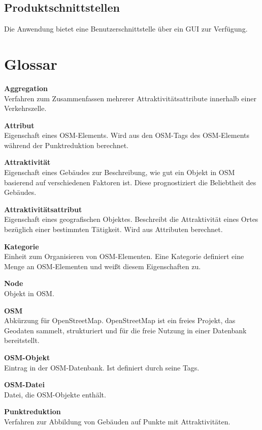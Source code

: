 \documentclass[parskip=full]{scrartcl} %
\begin{document}
\subsection{Produktschnittstellen}
Die Anwendung bietet eine Benutzerschnittstelle über ein GUI zur Verfügung.
\newpage





\section{Glossar}

\textbf{Aggregation}\\
Verfahren zum Zusammenfassen mehrerer Attraktivitätsattribute innerhalb einer Verkehrszelle.

\textbf{Attribut}\\
Eigenschaft eines OSM-Elements. Wird aus den OSM-Tags des OSM-Elements während der Punktreduktion berechnet.

\textbf{Attraktivität}\\
Eigenschaft eines Gebäudes zur Beschreibung, wie gut ein Objekt in OSM basierend auf verschiedenen Faktoren ist. Diese prognostiziert die Beliebtheit des Gebäudes.

\textbf{Attraktivitätsattribut}\\
Eigenschaft eines geografischen Objektes. Beschreibt die Attraktivität eines Ortes bezüglich einer bestimmten Tätigkeit. Wird aus Attributen berechnet.

\textbf{Kategorie}\\
Einheit zum Organisieren von OSM-Elementen. Eine Kategorie definiert eine Menge an OSM-Elementen und weißt diesem Eigenschaften zu.

\textbf{Node}\\
Objekt in OSM.

\textbf{OSM}\\
Abkürzung für OpenStreetMap. OpenStreetMap ist ein freies Projekt, das Geodaten sammelt, strukturiert und für die freie Nutzung in einer Datenbank bereitstellt.

\textbf{OSM-Objekt}\\
Eintrag in der OSM-Datenbank. Ist definiert durch seine Tags.

\textbf{OSM-Datei}\\
Datei, die OSM-Objekte enthält.

\textbf{Punktreduktion}\\
Verfahren zur Abbildung von Gebäuden auf Punkte mit Attraktivitäten.
\end{document}
